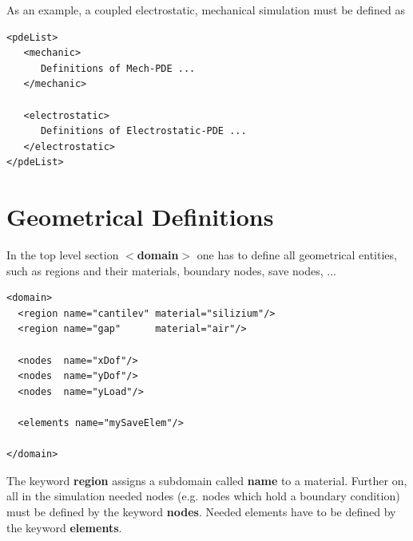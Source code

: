 \noindent
As an example, a coupled electrostatic, mechanical simulation must be
defined as
\begin{verbatim}
<pdeList>
   <mechanic>
      Definitions of Mech-PDE ...
   </mechanic>

   <electrostatic>
      Definitions of Electrostatic-PDE ...
   </electrostatic>
</pdeList>
\end{verbatim}



\section{Geometrical Definitions}
In the top level section {\bf $<$domain$>$} one has to define all
geometrical entities, such as regions and their materials, boundary
nodes, save nodes, ...
\begin{verbatim}
<domain>
  <region name="cantilev" material="silizium"/>
  <region name="gap"      material="air"/>

  <nodes  name="xDof"/>
  <nodes  name="yDof"/>
  <nodes  name="yLoad"/>

  <elements name="mySaveElem"/>

</domain>
\end{verbatim}

The keyword {\bf region} assigns a subdomain called {\bf name} to a material.
Further on, all in the simulation needed nodes (e.g. nodes which hold
a boundary condition) must be defined by the keyword {\bf nodes}.
Needed elements have to be defined by the keyword {\bf elements}.




